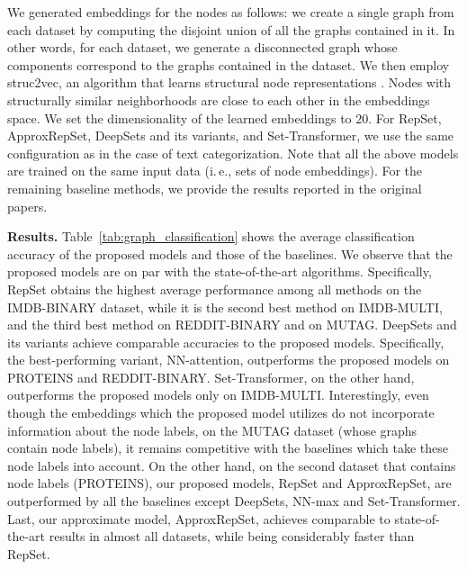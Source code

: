 \documentclass[twoside]{article}
\newcommand{\ie}{i.\,e., }
\begin{document}
We generated embeddings for the nodes as follows: we create a single graph from each dataset by computing the disjoint union of all the graphs contained in it.
In other words, for each dataset, we generate a disconnected graph whose components correspond to the graphs contained in the dataset.
We then employ struc2vec, an algorithm that learns structural node representations \citep{ribeiro2017struc2vec}.
Nodes with structurally similar neighborhoods are close to each other in the embeddings space.
We set the dimensionality of the learned embeddings to $20$.
For RepSet, ApproxRepSet, DeepSets and its variants, and Set-Transformer, we use the same configuration as in the case of text categorization.
Note that all the above models are trained on the same input data (\ie sets of node embeddings).
For the remaining baseline methods, we provide the results reported in the original papers.

\noindent\textbf{Results.}
Table~\ref{tab:graph_classification} shows the average classification accuracy of the proposed models and those of the baselines.
We observe that the proposed models are on par with the state-of-the-art algorithms.
Specifically, RepSet obtains the highest average performance among all methods on the IMDB-BINARY dataset, while it is the second best method on IMDB-MULTI, and the third best method on REDDIT-BINARY and on MUTAG.
DeepSets and its variants achieve comparable accuracies to the proposed models.
Specifically, the best-performing variant, NN-attention, outperforms the proposed models on PROTEINS and REDDIT-BINARY.
Set-Transformer, on the other hand, outperforms the proposed models only on  IMDB-MULTI.
Interestingly, even though the embeddings which the proposed model utilizes do not incorporate information about the node labels, on the MUTAG dataset (whose graphs contain node labels), it remains competitive with the baselines which take these node labels into account.
On the other hand, on the second dataset that contains node labels (PROTEINS), our proposed models, RepSet and ApproxRepSet, are outperformed by all the baselines except DeepSets, NN-max and Set-Transformer.
Last, our approximate model, ApproxRepSet, achieves comparable to state-of-the-art results in almost all datasets, while being considerably faster than RepSet.
\end{document}
